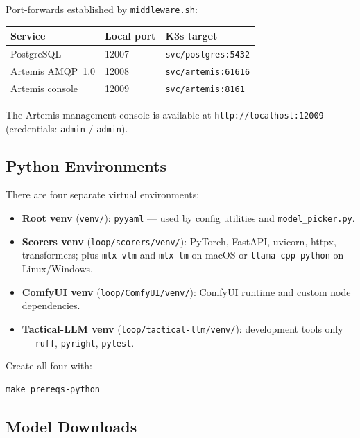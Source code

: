 \documentclass[11pt,letterpaper]{article}
\begin{document}
Port-forwards established by \texttt{middleware.sh}:

\begin{center}
\begin{tabular}{lll}
\toprule
\textbf{Service} & \textbf{Local port} & \textbf{K3s target} \\
\midrule
PostgreSQL        & 12007 & \texttt{svc/postgres:5432} \\
Artemis AMQP~1.0  & 12008 & \texttt{svc/artemis:61616} \\
Artemis console   & 12009 & \texttt{svc/artemis:8161} \\
\bottomrule
\end{tabular}
\end{center}

The Artemis management console is available at \texttt{http://localhost:12009}
(credentials: \texttt{admin} / \texttt{admin}).

\subsection{Python Environments}

There are four separate virtual environments:

\begin{itemize}
  \item \textbf{Root venv} (\texttt{venv/}): \texttt{pyyaml} --- used by
        config utilities and \texttt{model\_picker.py}.
  \item \textbf{Scorers venv} (\texttt{loop/scorers/venv/}): PyTorch,
        FastAPI, uvicorn, httpx, transformers; plus \texttt{mlx-vlm} and
        \texttt{mlx-lm} on macOS or \texttt{llama-cpp-python} on
        Linux/Windows.
  \item \textbf{ComfyUI venv} (\texttt{loop/ComfyUI/venv/}): ComfyUI
        runtime and custom node dependencies.
  \item \textbf{Tactical-LLM venv} (\texttt{loop/tactical-llm/venv/}):
        development tools only --- \texttt{ruff}, \texttt{pyright},
        \texttt{pytest}.
\end{itemize}

Create all four with:

\begin{lstlisting}[style=shell]
make prereqs-python
\end{lstlisting}

\subsection{Model Downloads}
\end{document}
